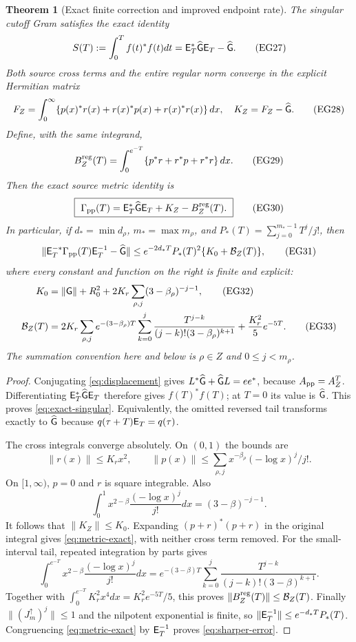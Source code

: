 \documentclass[11pt]{article}
\newtheorem{theorem}{Theorem}[section]
\begin{document}
\begin{theorem}[Exact finite correction and improved endpoint rate]
\label{thm:finite-correction}
The singular cutoff Gram satisfies the exact identity
\[
 S(T):=\int_0^T f(t)^*f(t)dt=\mathsf E_T^*\widehat{\mathsf G}\mathsf E_T-\widehat{\mathsf G}.
 \tag{EG27}\label{eq:exact-singular}
\]
Both source cross terms and the entire regular norm converge in the
explicit Hermitian matrix
\[
 F_Z=\int_0^\infty\{p(x)^*r(x)+r(x)^*p(x)+r(x)^*r(x)\}\,dx,
 \quad K_Z=F_Z-\widehat{\mathsf G}.\tag{EG28}\label{eq:finite-K}
\]
Define, with the same integrand,
\[
 B_Z^{\rm reg}(T)=\int_0^{e^{-T}}
                     \{p^*r+r^*p+r^*r\}\,dx.
 \tag{EG29}\label{eq:regular-tail}
\]
Then the exact source metric identity is
\[
 \boxed{\ \Gamma_{\rm pp}(T)=
       \mathsf E_T^*\widehat{\mathsf G}\mathsf E_T+K_Z-B_Z^{\rm reg}(T).\ }
 \tag{EG30}\label{eq:metric-exact}
\]
In particular, if $d_* =\min d_\rho$, $m_* =\max m_\rho$, and
$P_*(T)=\sum_{j=0}^{m_*-1}T^j/j!$, then
\[
 \|\mathsf E_T^{-*}\Gamma_{\rm pp}(T)\mathsf E_T^{-1}-\widehat{\mathsf G}\|
       \le e^{-2d_*T}P_*(T)^2\{K_0+\mathcal B_Z(T)\},
 \tag{EG31}\label{eq:sharper-error}
\]
where every constant and function on the right is finite and explicit:
\begin{align}
 K_0&=\|\mathsf G\|+R_0^2+
                2K_r\sum_{\rho,j}(3-\beta_\rho)^{-j-1},\tag{EG32}\label{eq:K0}\\
 \mathcal B_Z(T)&=2K_r\sum_{\rho,j}e^{-(3-\beta_\rho)T}
   \sum_{k=0}^j\frac{T^{j-k}}{(j-k)!(3-\beta_\rho)^{k+1}}
                       +\frac{K_r^2}5e^{-5T}.\tag{EG33}\label{eq:B-bound}
\end{align}
The summation convention here and below is $\rho\in Z$ and
$0\le j<m_\rho$.
\end{theorem}
\begin{proof}
Conjugating \eqref{eq:displacement} gives
$L^*\widehat{\mathsf G}+\widehat{\mathsf G} L=ee^*$, because
$A_{\rm pp}=A_Z^T$. Differentiating
$\mathsf E_T^*\widehat{\mathsf G}\mathsf E_T$ therefore gives $f(T)^*f(T)$; at $T=0$
its value is $\widehat{\mathsf G}$. This proves \eqref{eq:exact-singular}.
Equivalently, the omitted reversed tail transforms exactly to
$\widehat{\mathsf G}$ because $q(\tau+T)\mathsf E_T=q(\tau)$.

The cross integrals converge absolutely. On $(0,1)$ the bounds are
\[
 \|r(x)\|\le K_rx^2,\qquad
 \|p(x)\|\le\sum_{\rho,j}x^{-\beta_\rho}(-\log x)^j/j!.
\]
On $[1,\infty)$, $p=0$ and $r$ is square integrable. Also
\[
 \int_0^1x^{2-\beta}\frac{(-\log x)^j}{j!}dx
                         =(3-\beta)^{-j-1}.
\]
It follows that $\|K_Z\|\le K_0$. Expanding
$(p+r)^*(p+r)$ in the original integral gives
\eqref{eq:metric-exact}, with neither cross term removed.
For the small-interval tail, repeated integration by parts gives
\[
 \int_0^{e^{-T}}x^{2-\beta}\frac{(-\log x)^j}{j!}dx
 =e^{-(3-\beta)T}\sum_{k=0}^j
                    \frac{T^{j-k}}{(j-k)!(3-\beta)^{k+1}}.
\]
Together with $\int_0^{e^{-T}}K_r^2x^4dx=K_r^2e^{-5T}/5$, this
proves $\|B_Z^{\rm reg}(T)\|\le\mathcal B_Z(T)$.
Finally $\|(J_m^\uparrow)^j\|\le1$ and the nilpotent exponential
is finite, so $\|\mathsf E_T^{-1}\|\le e^{-d_*T}P_*(T)$.
Congruencing \eqref{eq:metric-exact} by $\mathsf E_T^{-1}$ proves
\eqref{eq:sharper-error}.
\end{proof}
\end{document}
